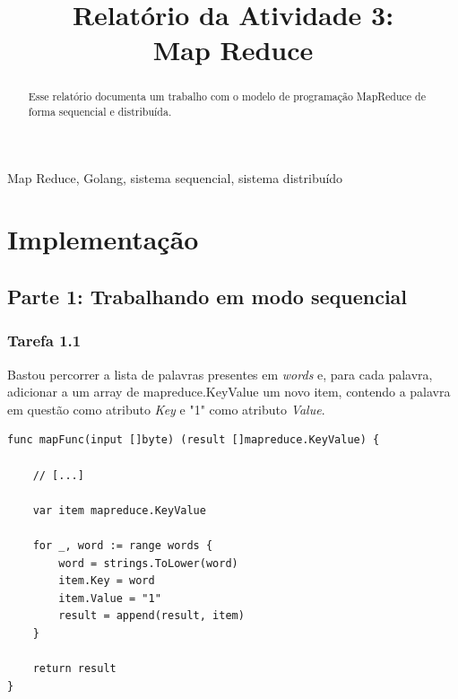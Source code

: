 \documentclass[conference]{IEEEtran}
\begin{document}
\title{Relatório da Atividade 3: \\ Map Reduce\\
}

\author{
}

\maketitle

\begin{abstract}
Esse relatório documenta um trabalho com o modelo de programação MapReduce de forma sequencial e distribuída.
\end{abstract}

\begin{IEEEkeywords}
Map Reduce, Golang, sistema sequencial, sistema distribuído
\end{IEEEkeywords}

\section{Implementação}

\subsection{Parte 1: Trabalhando em modo sequencial}

\subsubsection{Tarefa 1.1} Bastou percorrer a lista de palavras presentes em \textit{words} e, para cada palavra, adicionar a um array de mapreduce.KeyValue um novo item, contendo a palavra em questão como atributo \textit{Key} e "1" como atributo \textit{Value}.

\begin{lstlisting}
func mapFunc(input []byte) (result []mapreduce.KeyValue) {

	// [...]

	var item mapreduce.KeyValue

	for _, word := range words {
		word = strings.ToLower(word)
		item.Key = word
		item.Value = "1"
		result = append(result, item)
	}
	
	return result
}
\end{lstlisting}
\end{document}
